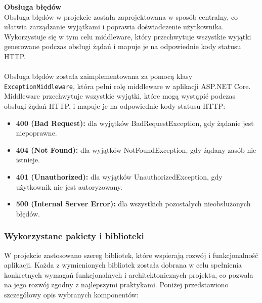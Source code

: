 \documentclass[twoside]{projektInzynierskiMS1}
\begin{document}
\vspace{1cm}

\noindent \textbf{Obsługa błędów}\\
Obsługa błędów w projekcie została zaprojektowana w sposób centralny, co ułatwia zarządzanie wyjątkami i poprawia doświadczenie użytkownika. Wykorzystuje się w tym celu middleware, który przechwytuje wszystkie wyjątki generowane podczas obsługi żądań i mapuje je na odpowiednie kody statusu HTTP.
\\\\
Obsługa błędów została zaimplementowana za pomocą klasy \texttt{ExceptionMiddleware}, która pełni rolę middleware w aplikacji ASP.NET Core. Middleware przechwytuje wszystkie wyjątki, które mogą wystąpić podczas obsługi żądań HTTP, i mapuje je na odpowiednie kody statusu HTTP:

\begin{itemize}
    \item \textbf{400 (Bad Request):} dla wyjątków BadRequestException, gdy żądanie jest niepoprawne.
    \item \textbf{404 (Not Found):} dla wyjątków NotFoundException, gdy żądany zasób nie istnieje.
    \item \textbf{401 (Unauthorized):} dla wyjątków UnauthorizedException, gdy użytkownik nie jest autoryzowany.
    \item \textbf{500 (Internal Server Error):} dla wszystkich pozostałych nieobsłużonych błędów.
\end{itemize}

\newpage

\subsubsection{Wykorzystane pakiety i biblioteki}

\noindent
W projekcie zastosowano szereg bibliotek, które wspierają rozwój i funkcjonalność aplikacji. Każda z wymienionych bibliotek została dobrana w celu spełnienia konkretnych wymagań funkcjonalnych i architektonicznych projektu, co pozwala na jego rozwój zgodny z najlepszymi praktykami. Poniżej przedstawiono szczegółowy opis wybranych komponentów:
\end{document}
